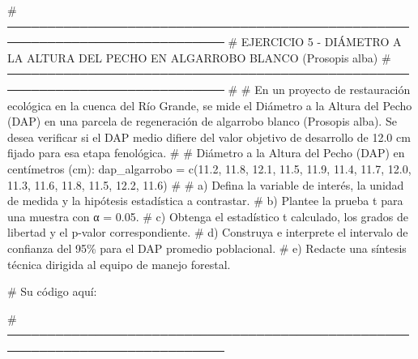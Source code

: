 \documentclass[
  spanish,
  letterpaper,
  DIV=11,
  numbers=noendperiod]{scrreprt}
\newenvironment{Shaded}{\begin{snugshade}}{\end{snugshade}}
\newcommand{\CommentTok}[1]{\textcolor[rgb]{0.37,0.37,0.37}{#1}}
\newcommand{\FloatTok}[1]{\textcolor[rgb]{0.68,0.00,0.00}{#1}}
\newcommand{\FunctionTok}[1]{\textcolor[rgb]{0.28,0.35,0.67}{#1}}
\newcommand{\NormalTok}[1]{\textcolor[rgb]{0.00,0.23,0.31}{#1}}
\newcommand{\OtherTok}[1]{\textcolor[rgb]{0.00,0.23,0.31}{#1}}
\begin{document}
\begin{Shaded}
\begin{Highlighting}[]
\CommentTok{\# ─────────────────────────────────────────────────────────────────────────────}
\CommentTok{\# EJERCICIO 5 {-} DIÁMETRO A LA ALTURA DEL PECHO EN ALGARROBO BLANCO (Prosopis alba)}
\CommentTok{\# ─────────────────────────────────────────────────────────────────────────────}
\CommentTok{\#}
\CommentTok{\# En un proyecto de restauración ecológica en la cuenca del Río Grande, se mide el Diámetro a la Altura del Pecho (DAP) en una parcela de regeneración de algarrobo blanco (Prosopis alba). Se desea verificar si el DAP medio difiere del valor objetivo de desarrollo de 12.0 cm fijado para esa etapa fenológica.}
\CommentTok{\#}
\CommentTok{\# Diámetro a la Altura del Pecho (DAP) en centímetros (cm):}
\NormalTok{dap\_algarrobo }\OtherTok{=} \FunctionTok{c}\NormalTok{(}\FloatTok{11.2}\NormalTok{, }\FloatTok{11.8}\NormalTok{, }\FloatTok{12.1}\NormalTok{, }\FloatTok{11.5}\NormalTok{, }\FloatTok{11.9}\NormalTok{, }\FloatTok{11.4}\NormalTok{, }\FloatTok{11.7}\NormalTok{, }\FloatTok{12.0}\NormalTok{, }\FloatTok{11.3}\NormalTok{, }\FloatTok{11.6}\NormalTok{, }\FloatTok{11.8}\NormalTok{, }\FloatTok{11.5}\NormalTok{, }\FloatTok{12.2}\NormalTok{, }\FloatTok{11.6}\NormalTok{)}
\CommentTok{\#}
\CommentTok{\# a) Defina la variable de interés, la unidad de medida y la hipótesis estadística a contrastar.}
\CommentTok{\# b) Plantee la prueba t para una muestra con α = 0.05.}
\CommentTok{\# c) Obtenga el estadístico t calculado, los grados de libertad y el p{-}valor correspondiente.}
\CommentTok{\# d) Construya e interprete el intervalo de confianza del 95\% para el DAP promedio poblacional.}
\CommentTok{\# e) Redacte una síntesis técnica dirigida al equipo de manejo forestal.}

\CommentTok{\# Su código aquí:}

\CommentTok{\# ─────────────────────────────────────────────────────────────────────────────}



\end{Highlighting}
\end{Shaded}
\end{document}
